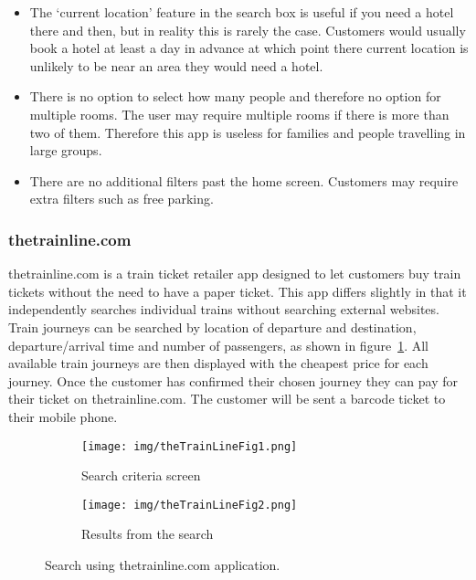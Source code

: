 \begin{itemize}
	\item The `current location' feature in the search box is useful if you
		need a hotel there and then, but in reality this is rarely the case.
		Customers would usually book a hotel at least a day in advance at which
		point there current location is unlikely to be near an area they would
		need a hotel.
	\item There is no option to select how many people and therefore no option
		for multiple rooms. The user may require multiple rooms if there is
		more than two of them. Therefore this app is useless for families and
		people travelling in large groups.
	\item There are no additional filters past the home screen. Customers may
		require extra filters such as free parking.
\end{itemize}

\newpage

\subsubsection{thetrainline.com}
\label{ssub:thetrainline}

thetrainline.com is a train ticket retailer app designed to let customers buy
train tickets without the need to have a paper ticket. This app differs
slightly in that it independently searches individual trains without searching
external websites. Train journeys can be searched by location of departure and
destination, departure/arrival  time and number of passengers, as shown in
figure~\ref{fig:theTrainLineFig1}. All available train journeys are then
displayed with the cheapest price for each journey.  Once the customer has
confirmed their chosen journey they can pay for their ticket on
thetrainline.com. The customer will be sent a barcode ticket to their mobile
phone.
\begin{figure}[ht]
	\centering
	\begin{subfigure}[b]{0.2\textwidth}
		\texttt{[image: img/theTrainLineFig1.png]}
		\caption{Search criteria screen}\label{fig:theTrainLineFig1}
	\end{subfigure}%
	\qquad
	\begin{subfigure}[b]{0.2\textwidth}
		\texttt{[image: img/theTrainLineFig2.png]}
		\caption{Results from the search}\label{fig:theTrainLineFig2}
	\end{subfigure}
	\caption{Search using thetrainline.com application.
	}\label{fig:thetrainline1}
\end{figure}

